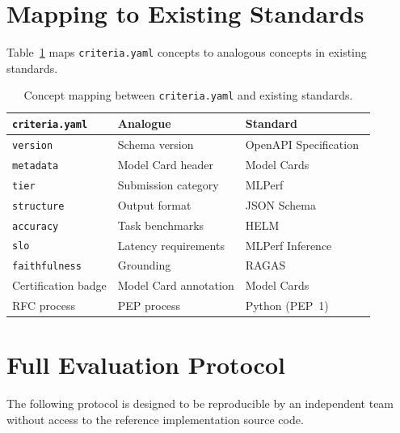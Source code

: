\documentclass[11pt]{article}
\newcommand{\criteriayaml}{\texttt{criteria.yaml}}
\begin{document}
\section{Mapping to Existing Standards}
\label{app:mapping}

Table~\ref{tab:mapping} maps \criteriayaml{} concepts to analogous concepts in existing standards.

\begin{table}[ht]
\centering
\caption{Concept mapping between \criteriayaml{} and existing standards.}
\label{tab:mapping}
\small
\begin{tabularx}{\linewidth}{lXX}
\toprule
\textbf{\criteriayaml{}} & \textbf{Analogue} & \textbf{Standard} \\
\midrule
\texttt{version} & Schema version & OpenAPI Specification~\citep{openapi2021} \\
\texttt{metadata} & Model Card header & Model Cards~\citep{mitchell2019modelcards} \\
\texttt{tier} & Submission category & MLPerf~\citep{reddi2020mlperf} \\
\texttt{structure} & Output format & JSON Schema~\citep{jsonschema2020} \\
\texttt{accuracy} & Task benchmarks & HELM~\citep{liang2023helm} \\
\texttt{slo} & Latency requirements & MLPerf Inference~\citep{reddi2020mlperf} \\
\texttt{faithfulness} & Grounding & RAGAS~\citep{es2023ragas} \\
Certification badge & Model Card annotation & Model Cards~\citep{mitchell2019modelcards} \\
RFC process & PEP process & Python (PEP~1) \\
\bottomrule
\end{tabularx}
\end{table}


\section{Full Evaluation Protocol}
\label{app:protocol}

The following protocol is designed to be reproducible by an independent team without access to the reference implementation source code.
\end{document}
